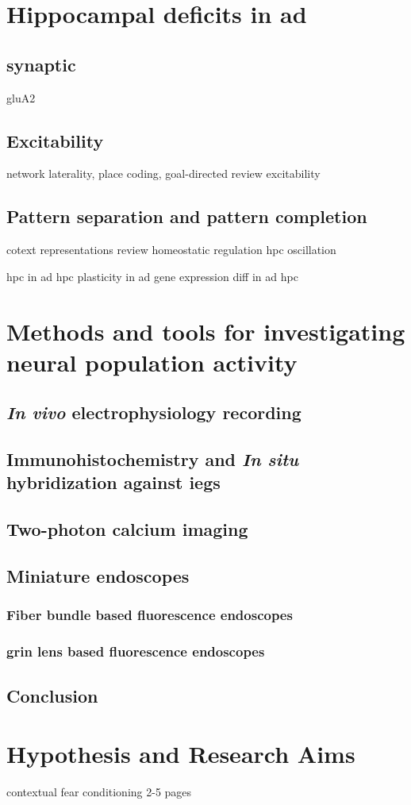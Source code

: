 \section{Hippocampal deficits in \gls{ad}}
\subsection{synaptic \label{ad.synaptic}}
gluA2
\subsection{Excitability}
    network laterality, place coding, goal-directed review\citep{kitanishi16}
    \citep{oh14} excitability
\subsection{Pattern separation and pattern completion}
    \citep{smith14} cotext representations review
    homeostatic regulation \citep{mizumori13}
    \citep{draguhn14} hpc oscillation


\citep{moodley14} hpc in \gls{ad}
\citep{mufson15} hpc plasticity in \gls{ad}
\citep{saura15} gene expression diff in \gls{ad} hpc

\section{Methods and tools for investigating neural population activity}
\subsection{\textit{In vivo} electrophysiology recording}
\subsection{Immunohistochemistry and \textit{In situ} hybridization against \glspl{ieg}}
\subsection{Two-photon calcium imaging}
\subsection{Miniature endoscopes}
\subsubsection{Fiber bundle based fluorescence endoscopes}
\subsubsection{\gls{grin} lens based fluorescence endoscopes}
\subsection{Conclusion}


\section{Hypothesis and Research Aims}
\citep{rozeske14} contextual fear conditioning
2-5 pages
